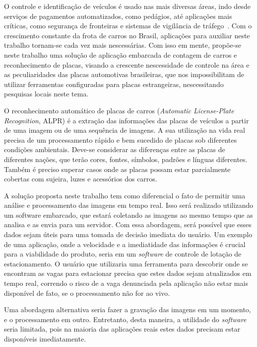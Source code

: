 
O controle e identificação de veículos é usado nas mais diversas áreas, indo
desde serviços de pagamentos automatizados, como pedágios, até aplicações mais
críticas, como segurança de fronteiras e sistemas de vigilância de
tráfego~\cite{ahmad2015automatic}. Com o crescimento constante da frota de
carros no Brasil, aplicações para auxiliar neste trabalho tornam-se cada vez
mais nescessárias. Com isso em mente, propõe-se neste trabalho uma solução de
aplicação embarcada de contagem de carros e reconhecimento de placas, visando a
crescente nescessidade de controle na área e as peculiaridades das placas
automotivas brasileiras, que nos impossibilitam de utilizar ferramentas
configuradas para placas estrangeiras, nescessitando pesquisas locais neste
tema.

O reconhecimento automático de placas de carros (\emph{Automatic License-Plate
Recognition}, ALPR) é a extração das informações das placas de veículos a partir
de uma imagem ou de uma sequência de imagens. A sua utilização na vida real
precisa de um processamento rápido e bem sucedido de placas sob diferentes
condições ambientais. Deve-se considerar as diferenças entre as placas de
diferentes nações, que terão cores, fontes, símbolos, padrões e línguas
diferentes. Também é preciso superar casos onde as placas possam estar
parcialmente cobertas com sujeira, luzes e acessórios dos
carros.~\cite{s2013automatic}

A solução proposta neste trabalho tem como diferencial o fato de permitir uma
análise e processamento das imagens em tempo real. Isso será realizado
utilizando um software embarcado, que estará coletando as imagens ao mesmo tempo
que as analisa e as envia para um servidor. Com essa abordagem, será possível
que esses dados sejam úteis para uma tomada de decisão imediata do usuário. Um
exemplo de uma aplicação, onde a velocidade e a imediatidade das informações é
crucial para a viabilidade do produto, seria em um \emph{software} de controle
de lotação de estacionamento. O usuário que utilizaria uma ferramenta para
descobrir onde se encontram as vagas para estacionar precisa que estes dados
sejam atualizados em tempo real, correndo o risco de a vaga denunciada pela
aplicação não estar mais disponível de fato, se o processamento não for ao vivo.

Uma abordagem alternativa seria fazer a gravação das imagens em um momento, e o
processamento em outro. Entretanto, desta maneira, a utilidade do
\emph{software} seria limitada, pois na maioria das aplicações reais estes dados
precisam estar disponíveis imediatamente.

